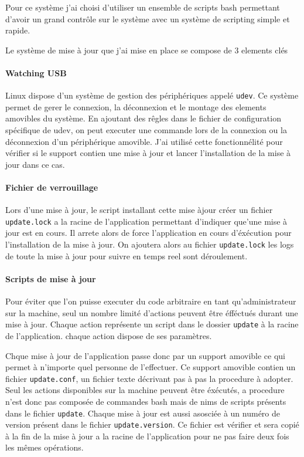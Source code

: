 Pour ce système j'ai choisi d'utiliser un ensemble de scripts bash permettant d'avoir un grand contrôle sur le système avec un système de scripting simple et rapide.

Le système de mise à jour que j'ai mise en place se compose de 3 elements clés

\paragraph{Watching USB} Linux dispose d'un système de gestion des périphériques appelé \texttt{udev}.
Ce système permet de gerer le connexion, la déconnexion et le montage des elements amovibles du système.
En ajoutant des rêgles dans le fichier de configuration spécifique de udev, on peut executer une commande lors de la connexion ou la déconnexion d'un périphérique amovible.
J'ai utilisé cette fonctionnélité pour vérifier si le support contien une mise à jour et lancer l'installation de la mise à jour dans ce cas.

\paragraph{Fichier de verrouillage} Lors d'une mise à jour, le script installant cette mise àjour créer un fichier \texttt{update.lock} a la racine de l'application permettant d'indiquer que'une mise à jour est en cours.
Il arrete alors de force l'application en cours d'éxécution pour l'installation de la mise à jour.
On ajoutera alors au fichier \texttt{update.lock} les logs de toute la mise à jour pour suivre en temps reel sont déroulement.

\paragraph{Scripts de mise à jour} Pour éviter que l'on puisse executer du code arbitraire en tant qu'administrateur sur la machine, seul un nombre limité d'actions peuvent être éfféctués durant une mise à jour.
Chaque action représente un script dans le dossier \texttt{update} à la racine de l'application.
chaque action dispose de ses paramètres.

\medskip

Chque mise à jour de l'application passe donc par un support amovible ce qui permet à n'importe quel personne de l'effectuer.
Ce support amovible contien un fichier \texttt{update.conf}, un fichier texte décrivant pas à pas la procedure à adopter.
Seul les actions disponibles sur la machine peuvent être éxécutés, a procedure n'est donc pas composée de commandes bash mais de nims de scripts présents dans le fichier \texttt{update}.
Chaque mise à jour est aussi asosciée à un numéro de version présent dans le fichier \texttt{update.version}.
Ce fichier est vérifier et sera copié à la fin de la mise à jour a la racine de l'application pour ne pas faire deux fois les mêmes opérations.

